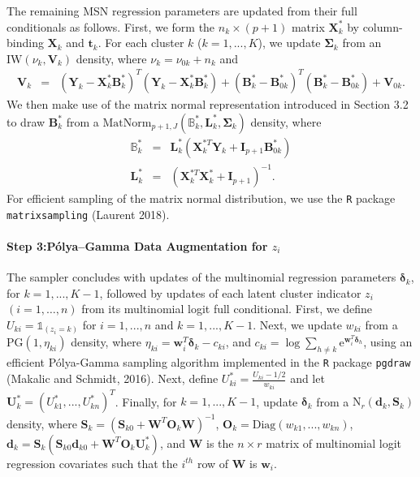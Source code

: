 \documentclass[useAMS,referee]{biom}
\begin{document}
The remaining MSN regression parameters are updated from their full conditionals as follows. First, we form the $n_k \times (p + 1)$ matrix $\mathbf{X}^*_k$ by column-binding $\mathbf{X}_k$ and $\mathbf{t}_k$. For each cluster $k$ ($k = 1,...,K$), we update $\boldsymbol\Sigma_k$ from an $\text{IW}(\nu_k,\mathbf{V}_k)$ density, where $\nu_k = \nu_{0k} + n_k$ and\begin{eqnarray}
	\mathbf{V}_k &=&  (\mathbf{Y}_k-\mathbf{X}^*_k \mathbf{B}^*_k)^T (\mathbf{Y}_k - \mathbf{X}^*_k \mathbf{B}^*_k) + (\mathbf{B}_k^* - \mathbf{B}^*_{0k})^T (\mathbf{B}^*_k - \mathbf{B}^*_{0k}) + \mathbf{V}_{0k}. \nonumber
\end{eqnarray} 
We then make use of the matrix normal representation introduced in Section 3.2 to draw $\mathbf{B}^*_k$ from a $\text{MatNorm}_{p+1,J}(\mathbb{B}_k^*,\mathbf{L}_k^{*},\boldsymbol\Sigma_k)$ density, where
\begin{eqnarray}
	\mathbb{B}^*_k &=& \mathbf{L}_k^{*} (\mathbf{X}^{*T}_k \mathbf{Y}_k + \mathbf{I}_{p+1} \mathbf{B}^*_{0k}) \nonumber \\
	\mathbf{L}^*_k &=& (\mathbf{X}^{*T}_k \mathbf{X}^*_k + \mathbf{I}_{p+1})^{-1}. \nonumber
\end{eqnarray}
For efficient sampling of the matrix normal distribution, we use the \texttt{R} package \texttt{matrixsampling} (Laurent 2018).

\paragraph{\textbf{Step 3:}P\'olya--Gamma Data Augmentation for $z_i$} The sampler concludes with updates of the multinomial regression parameters $\boldsymbol\delta_k$, for $k = 1,...,K-1$, followed by updates of each latent cluster indicator $z_i$ $(i=1,\ldots,n)$ from its multinomial logit full conditional. First, we define $U_{ki} = \mathds{1}_{(z_i = k)}$ for $i = 1,...,n$ and $k = 1,...,K-1$. Next, we update ${w}_{ki}$ from a $\text{PG}(1,\eta_{ki})$ density, where $\eta_{ki} = \mathbf{w}_i^T \boldsymbol\delta_k - {c}_{ki}$, and ${c}_{ki} = \log \sum_{h \ne k} \text{e}^{\mathbf{w}_i^T \boldsymbol\delta_{h}}$, using an efficient P\'olya-Gamma sampling algorithm implemented in the \texttt{R} package \texttt{pgdraw} (Makalic and Schmidt, 2016). Next, define $U^*_{ki} = \frac{U_{ki} - 1/2}{{w}_{ki}}$ and let $\mathbf{U}^*_k = (U^*_{k1},...,U^*_{kn})^T$. Finally, for $k = 1,...,K-1$, update $\boldsymbol\delta_k$ from a $\text{N}_r(\mathbf{d}_k,\mathbf{S}_k)$ density, where $\mathbf{S}_k = (\mathbf{S}_{k0} + \mathbf{W}^T \mathbf{O}_k \mathbf{W})^{-1}$, $\mathbf{O}_k = \text{Diag}({w}_{k1},...,{w}_{kn})$,  $\mathbf{d}_k = \mathbf{S}_k (\mathbf{S}_{k0}\mathbf{d}_{k0} + \mathbf{W}^T \mathbf{O}_k \mathbf{U}^*_k)$, and $\mathbf{W}$ is the $n \times r$ matrix of multinomial logit regression covariates such that the $i^{th}$ row of $\mathbf{W}$ is $\mathbf{w}_i$.
\end{document}
